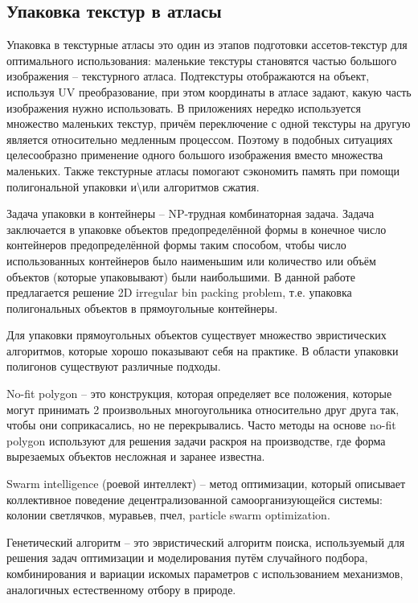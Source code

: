 \documentclass{fefu_thesis/cls/fefu}
\begin{document}
    \subsection{Упаковка текстур в атласы}

    Упаковка в текстурные атласы это один из этапов подготовки ассетов-текстур для оптимального использования: маленькие текстуры становятся частью большого изображения -- текстурного атласа. Под­текстуры отображаются на объект, используя UV ­преобразование, при этом координаты в атласе задают, какую часть изображения нужно использовать. В приложениях нередко используется множество маленьких текстур, причём переключение с одной текстуры на другую является относительно медленным процессом. Поэтому в подобных ситуациях целесообразно применение одного большого изображения вместо множества маленьких. Также текстурные атласы помогают сэкономить память при помощи полигональной упаковки и\textbackslash или алгоритмов сжатия.

    Задача упаковки в контейнеры -- NP-трудная комбинаторная задача. Задача заключается в упаковке объектов предопределённой формы в конечное число контейнеров предопределённой формы таким способом, чтобы число использованных контейнеров было наименьшим или количество или объём объектов (которые упаковывают) были наибольшими. В данной работе предлагается решение 2D irregular bin packing problem, т.е. упаковка полигональных объектов в прямоугольные контейнеры.

    Для упаковки прямоугольных объектов существует множество эвристических алгоритмов\cite{ThousandWayToPackBin}, которые хорошо показывают себя на практике. В области упаковки полигонов существуют различные подходы.

    No-fit polygon\cite{NofitPolygon}\cite{NofitPolygon2} -- это конструкция, которая определяет все положения, которые могут принимать 2 произвольных многоугольника относительно друг друга так, чтобы они соприкасались, но не перекрывались. Часто методы на основе no-fit polygon используют для решения задачи раскроя на производстве, где форма вырезаемых объектов несложная и заранее известна.

    Swarm intelligence (роевой интеллект) -- метод оптимизации, который описывает коллективное поведение децентрализованной самоорганизующейся системы: колонии светлячков\cite{FireFly}, муравьев\cite{AntColony}, пчел\cite{PlayrixArticle}, particle swarm optimization\cite{PSO}.

    Генетический алгоритм\cite{JAKOBS1996165} -- это эвристический алгоритм поиска, используемый для решения задач оптимизации и моделирования путём случайного подбора, комбинирования и вариации искомых параметров с использованием механизмов, аналогичных естественному отбору в природе.
\end{document}
